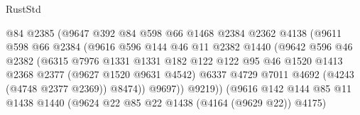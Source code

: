 \begin{lexlean}{RustStd}
\begin{coremodule}
                                  @84
                                  @2385
                                  (@9647
                                    @392
                                    @84
                                    @598
                                    @66
                                    @1468
                                    @2384
                                    @2362
                                    @4138
                                    (@9611
                                      @598
                                      @66
                                      @2384
                                      (@9616
                                        @596
                                        @144
                                        @46
                                        @11
                                        @2382
                                        @1440
                                        (@9642
                                          @596
                                          @46
                                          @2382
                                          (@6315
                                            @7976
                                            @1331
                                            @1331
                                            @182
                                            @122
                                            @122
                                            @95
                                            @46
                                            @1520
                                            @1413
                                            @2368
                                            @2377
                                            (@9627 @1520 @9631 @4542)
                                            @6337
                                            @4729
                                            @7011
                                            @4692
                                            (@4243 (@4748 @2377 @2369))
                                            @8474))
                                        @9697))
                                    @9219))
                                (@9616
                                  @142
                                  @144
                                  @85
                                  @11
                                  @1438
                                  @1440
                                  (@9624 @22 @85 @22 @1438 (@4164 (@9629 @22)) @4175)

\end{coremodule}
\end{lexlean}
